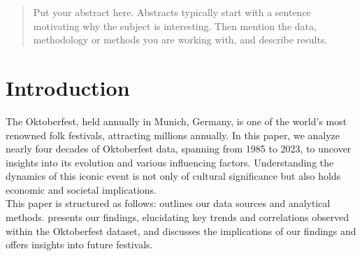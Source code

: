 \documentclass{article}
\theoremstyle{plain}
\theoremstyle{definition}
\theoremstyle{remark}
\begin{document}
\printAffiliationsAndNotice{\icmlEqualContribution} %

\begin{abstract}
Put your abstract here. Abstracts typically start with a sentence motivating why the subject is interesting. Then mention the data, methodology or methods you are working with, and describe results. 
\end{abstract}

\section{Introduction}\label{sec:intro}

The Oktoberfest, held annually in Munich, Germany, is one of the world's most renowned folk festivals, attracting millions annually. In this paper, we analyze nearly four decades of Oktoberfest data, spanning from 1985 to 2023, to uncover insights into its evolution and various influencing factors. Understanding the dynamics of this iconic event is not only of cultural significance but also holds economic and societal implications. \\
This paper is structured as follows:  outlines our data sources and analytical methods.  presents our findings, elucidating key trends and correlations observed within the Oktoberfest dataset, and  discusses the implications of our findings and offers insights into future festivals.\\
\end{document}

